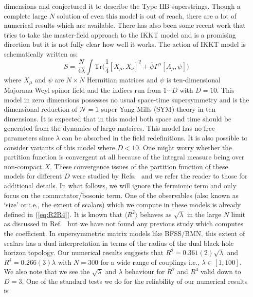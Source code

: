 \documentclass[letter,11pt]{article}
\begin{document}
dimensions and conjectured it to describe the Type IIB superstrings. Though a complete large $N$ solution of even this model is out of reach, there are a lot of numerical results which are available. 
There has also been some recent work that tries to take the master-field approach to the
IKKT model \cite{Klinkhamer:2021wrv} and is a promising direction but it is not fully clear how well it works. The action of IKKT model is schematically written as:
\begin{equation}
	\label{eq:IKKT} 
S = \frac{N}{4\lambda} \int \mbox{Tr} \Big( \frac{1}{4} [X_\mu, X_\nu]^{2} + \overline{\psi} \Gamma^{\mu} [A_{\mu},\psi] \Big) 
\end{equation}
where $X_{\mu}$ and $\psi$ are $N \times N$ Hermitian matrices and $\psi$ is ten-dimensional Majorana-Weyl spinor field and the indices run from $ 1 \cdots D$ with $D=10$. This model in zero dimensions possesses no usual space-time supersymmetry and is the dimensional reduction of $\mathcal{N}=1$ super Yang-Mills (SYM) theory in ten dimensions. It is expected that in this model both space and time should be generated from the dynamics of large matrices. This model has no free parameters since $\lambda$ can be absorbed in the field redefinitions. It is also possible to consider variants of this model where $D < 10$. One might worry whether the partition function is convergent at all because of the integral measure being over non-compact $X$. These convergence issues of the partition function of these models for different $D$ were studied by Refs.~\cite{Krauth:1998yu,Krauth:1999qw} and we
refer the reader to those for additional details.  In what follows, we will ignore the fermionic 
term and only focus on the commutator/bosonic term. One of the observables (also known as `size' or i.e., the extent of scalars) which we compute in these models is already defined in (\ref{eq:R2R4}). It is known that $\langle R^2 \rangle$ behaves as $\sqrt{\lambda}$ in the large $N$ limit as discussed in Ref.~\cite{Hotta:1998en} but we have not found any previous study
which computes the coefficient. In supersymmetric matrix models like BFSS/BMN, this 
extent of scalars has a dual interpretation in terms of the radius of 
the dual black hole horizon topology.  Our numerical results suggests 
that $R^2 = 0.361(2) \sqrt{\lambda}$ 
and $R^4 = 0.266(3) \lambda$ with $N = 300$ for a wide range of couplings i.e., 
$\lambda \in [1,100]$. 
We also note that we see the $\sqrt{\lambda}$ and $\lambda$ behaviour for 
$R^2$ and $R^4$ valid down to $D=3$. 
One of the standard tests we do for the reliability of our numerical results is 
\end{document}
